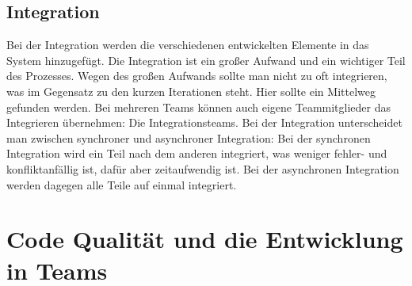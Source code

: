 \subsection{Integration}
Bei der Integration werden die verschiedenen entwickelten Elemente in das System hinzugefügt. Die Integration ist ein großer Aufwand und ein wichtiger Teil des Prozesses. Wegen des großen Aufwands sollte man nicht zu oft integrieren, was im Gegensatz zu den kurzen Iterationen steht. Hier sollte ein Mittelweg gefunden werden. Bei mehreren Teams können auch eigene Teammitglieder das Integrieren übernehmen: Die Integrationsteams. Bei der Integration unterscheidet man zwischen synchroner und asynchroner Integration: Bei der synchronen Integration wird ein Teil nach dem anderen integriert, was weniger fehler- und konfliktanfällig ist, dafür aber zeitaufwendig ist. Bei der asynchronen Integration werden dagegen alle Teile auf einmal integriert. ~\parencite[vgl. 106-110]{ecksteinTeams}
\section{Code Qualität und die Entwicklung in Teams}

